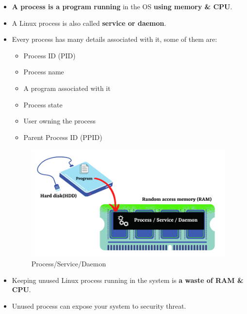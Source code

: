 \setlength{\columnsep}{3pt}
\begin{flushleft}
	\begin{itemize}
		\item \textbf{A process is a program running} in the OS \textbf{using memory \& CPU}.
		\item A Linux process is also called \textbf{service or daemon}.
		\item Every process has many details associated with it, some of them are:
		\begin{itemize}
			\item Process ID (PID)
			\item Process name
			\item A program associated with it
			\item Process state
			\item User owning the process
			\item Parent Process ID (PPID)
		\end{itemize}
		
		\begin{figure}[h!]
			\centering
			\includegraphics[scale=.55]{content/chapter12/images/process.png}
			\caption{Process/Service/Daemon}
			\label{fig:process}
		\end{figure}
		
		\item Keeping unused Linux process running in the system is \textbf{a waste of RAM \& CPU}.
		\item Unused process can expose your system to \color{red}security threat.
	\end{itemize}
\end{flushleft}

\newpage


